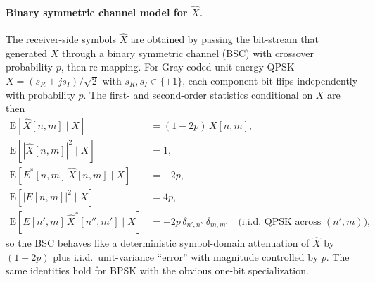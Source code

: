 \documentclass[11pt]{article}
\begin{document}
\paragraph{Binary symmetric channel model for \(\hat{X}\).} The receiver-side symbols \(\hat{X}\) are obtained by passing the bit-stream that generated \(X\) through a binary symmetric channel (BSC) with crossover probability \(p\), then re-mapping. For Gray-coded unit-energy QPSK \(X = (s_R + j s_I)/\sqrt{2}\) with \(s_R, s_I \in \{\pm 1\}\), each component bit flips independently with probability \(p\). The first- and second-order statistics conditional on \(X\) are then
\begin{align}
    \mathrm{E}[\hat{X}[n,m] \mid X] &= (1-2p)\, X[n,m], \\
    \mathrm{E}[|\hat{X}[n,m]|^2 \mid X] &= 1, \\
    \mathrm{E}[E^*[n,m]\, \hat{X}[n,m] \mid X] &= -2p, \\
    \mathrm{E}[|E[n,m]|^2 \mid X] &= 4p, \\
    \mathrm{E}[E[n',m]\, \hat{X}^*[n'',m'] \mid X] &= -2p\, \delta_{n',n''}\, \delta_{m,m'} \quad \text{(i.i.d.\ QPSK across \((n',m)\))},
\end{align}
so the BSC behaves like a deterministic symbol-domain attenuation of \(\hat{X}\) by \((1-2p)\) plus i.i.d.\ unit-variance ``error'' with magnitude controlled by \(p\). The same identities hold for BPSK with the obvious one-bit specialization.
\end{document}
